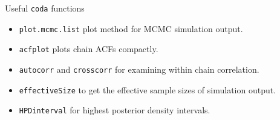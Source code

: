 \documentclass{beamer}
\begin{document}
\begin{frame}{Useful {\tt coda} functions}
\begin{itemize}
\item {\tt plot.mcmc.list} plot method for MCMC simulation output.
\item {\tt acfplot} plots chain ACFs compactly.
\item {\tt autocorr} and {\tt crosscorr} for examining within chain correlation.
\item {\tt effectiveSize} to get the effective sample sizes of simulation output.
\item {\tt HPDinterval} for highest posterior density intervals.
\end{itemize}
\end{frame}
\end{document}
